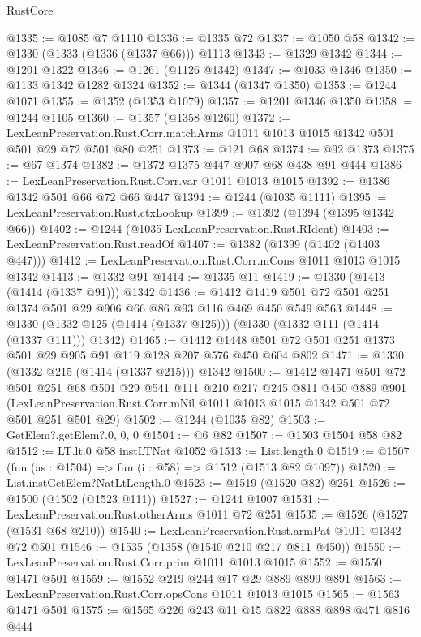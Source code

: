 \begin{lexlean}{RustCore}
\begin{coremodule}
@1335 := @1085 @7 @1110
@1336 := @1335 @72
@1337 := @1050 @58
@1342 := @1330 (@1333 (@1336 (@1337 @66))) @1113
@1343 := @1329 @1342
@1344 := @1201 @1322
@1346 := @1261 (@1126 @1342)
@1347 := @1033 @1346
@1350 := @1133 @1342 @1282 @1324
@1352 := @1344 (@1347 @1350)
@1353 := @1244 @1071
@1355 := @1352 (@1353 @1079)
@1357 := @1201 @1346 @1350
@1358 := @1244 @1105
@1360 := @1357 (@1358 @1260)
@1372 := LexLeanPreservation.Rust.Corr.matchArms
    @1011
    @1013
    @1015
    @1342
    @501
    @501
    @29
    @72
    @501
    @80
    @251
@1373 := @121 @68
@1374 := @92 @1373
@1375 := @67 @1374
@1382 := @1372 @1375 @447 @907 @68 @438 @91 @444
@1386 := LexLeanPreservation.Rust.Corr.var @1011 @1013 @1015
@1392 := @1386 @1342 @501 @66 @72 @66 @447
@1394 := @1244 (@1035 @1111)
@1395 := LexLeanPreservation.Rust.ctxLookup
@1399 := @1392 (@1394 (@1395 @1342 @66))
@1402 := @1244 (@1035 LexLeanPreservation.Rust.RIdent)
@1403 := LexLeanPreservation.Rust.readOf
@1407 := @1382 (@1399 (@1402 (@1403 @447)))
@1412 := LexLeanPreservation.Rust.Corr.mCons @1011 @1013 @1015 @1342
@1413 := @1332 @91
@1414 := @1335 @11
@1419 := @1330 (@1413 (@1414 (@1337 @91))) @1342
@1436 := @1412 @1419 @501 @72 @501 @251 @1374 @501 @29 @906 @66 @86 @93 @116 @469 @450 @549 @563
@1448 := @1330 (@1332 @125 (@1414 (@1337 @125))) (@1330 (@1332 @111 (@1414 (@1337 @111))) @1342)
@1465 := @1412 @1448 @501 @72 @501 @251 @1373 @501 @29 @905 @91 @119 @128 @207 @576 @450 @604 @802
@1471 := @1330 (@1332 @215 (@1414 (@1337 @215))) @1342
@1500 := @1412
    @1471
    @501
    @72
    @501
    @251
    @68
    @501
    @29
    @541
    @111
    @210
    @217
    @245
    @811
    @450
    @889
    @901
    (LexLeanPreservation.Rust.Corr.mNil @1011 @1013 @1015 @1342 @501 @72 @501 @251 @501 @29)
@1502 := @1244 (@1035 @82)
@1503 := GetElem?.getElem?.{0, 0, 0}
@1504 := @6 @82
@1507 := @1503 @1504 @58 @82
@1512 := LT.lt.{0} @58 instLTNat @1052
@1513 := List.length.{0}
@1519 := @1507 (fun (as : @1504) => fun (i : @58) => @1512 (@1513 @82 @1097))
@1520 := List.instGetElem?NatLtLength.{0}
@1523 := @1519 (@1520 @82) @251
@1526 := @1500 (@1502 (@1523 @111))
@1527 := @1244 @1007
@1531 := LexLeanPreservation.Rust.otherArms @1011 @72 @251
@1535 := @1526 (@1527 (@1531 @68 @210))
@1540 := LexLeanPreservation.Rust.armPat @1011 @1342 @72 @501
@1546 := @1535 (@1358 (@1540 @210 @217 @811 @450))
@1550 := LexLeanPreservation.Rust.Corr.prim @1011 @1013 @1015
@1552 := @1550 @1471 @501
@1559 := @1552 @219 @244 @17 @29 @889 @899 @891
@1563 := LexLeanPreservation.Rust.Corr.opsCons @1011 @1013 @1015
@1565 := @1563 @1471 @501
@1575 := @1565 @226 @243 @11 @15 @822 @888 @898 @471 @816 @444

\end{coremodule}
\end{lexlean}
